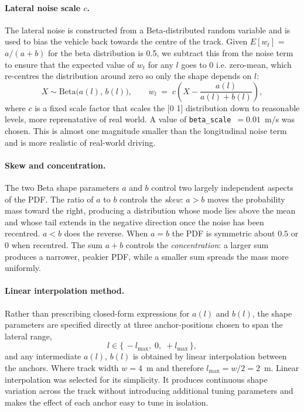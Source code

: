 \paragraph{Lateral noise scale $c$.}
The lateral noise is constructed from a Beta-distributed random variable and is used to bias the vehicle back towards the centre of the track. Given $E[w_t]$ = $a/(a+b)$ for the beta distribution is 0.5, we subtract this from the noise term to ensure that the expected value of $w_t$ for any $l$ goes to 0 i.e. zero-mean, which re-centres the distribution around zero so only the shape depends on $l$:
\begin{equation}
    X \sim \mathrm{Beta}\bigl(a(l),\,b(l)\bigr), \qquad
    w_l \;=\; c \left( X - \frac{a(l)}{a(l)+b(l)} \right),
    \label{eq:beta_noise}
\end{equation}
where $c$ is a fixed scale factor that scales the [0 1] distribution down to reasonable levels, more reprenatative of real world. A value of \texttt{beta\_scale}~$=0.01$~m/s was chosen. This is almost one magnitude smaller than the longitudinal noise term and is more realistic of real-world driving.

\paragraph{Skew and concentration.}
The two Beta shape parameters $a$ and $b$ control two largely independent aspects of the PDF. The ratio of $a$ to $b$ controls the \emph{skew}: $a>b$ moves the probability mass toward the right, producing a distribution whose mode lies above the mean and whose tail extends in the negative direction once the noise has been recentred. $a<b$ does the reverse. When $a=b$ the PDF is symmetric about $0.5$ or $0$ when recentred. The sum $a+b$ controls the \emph{concentration}: a larger sum produces a narrower, peakier PDF, while a smaller sum spreads the mass more uniformly.

\paragraph{Linear interpolation method.}
Rather than prescribing closed-form expressions for $a(l)$ and $b(l)$, the shape parameters are specified directly at three anchor-positions chosen to span the lateral range,
\begin{equation}
    l \in \{\, -l_{\max},\; 0,\; +l_{\max} \,\},
\end{equation}
and any intermediate $a(l)$, $b(l)$ is obtained by linear interpolation between the anchors. Where track width $w=4$~m and therefore $l_{\max}=w/2=2$~m. Linear interpolation was selected for its simplicity. It produces continuous shape variation across the track without introducing additional tuning parameters and makes the effect of each anchor easy to tune in isolation.


